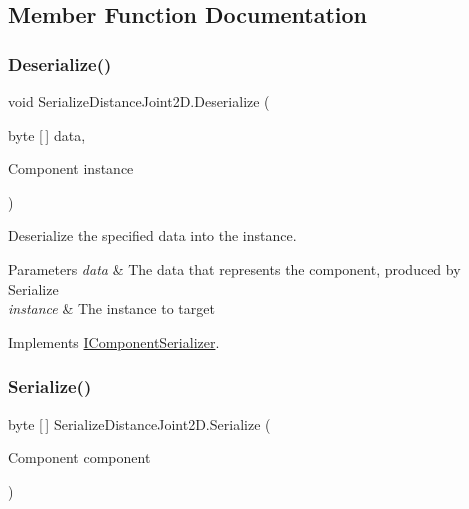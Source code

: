 \subsection{Member Function Documentation}
\mbox{\label{class_serialize_distance_joint2_d_a0b7341e25aba6354afa746c912bb20f5}} 
\subsubsection{\texorpdfstring{Deserialize()}{Deserialize()}}
{\footnotesize\ttfamily void Serialize\+Distance\+Joint2\+D.\+Deserialize (\begin{DoxyParamCaption}\item[{byte \mbox{[}$\,$\mbox{]}}]{data,  }\item[{Component}]{instance }\end{DoxyParamCaption})\hspace{0.3cm}{\ttfamily [inline]}}



Deserialize the specified data into the instance. 


\begin{DoxyParams}{Parameters}
{\em data} & The data that represents the component, produced by Serialize \\
\hline
{\em instance} & The instance to target \\
\hline
\end{DoxyParams}


Implements \hyperlink{interface_i_component_serializer_a4cc366a5c78b33d47a90c209d8fed883}{I\+Component\+Serializer}.

\mbox{\label{class_serialize_distance_joint2_d_a5eecfd9c48d46eb25958ffb301924b3b}} 
\subsubsection{\texorpdfstring{Serialize()}{Serialize()}}
{\footnotesize\ttfamily byte \mbox{[}$\,$\mbox{]} Serialize\+Distance\+Joint2\+D.\+Serialize (\begin{DoxyParamCaption}\item[{Component}]{component }\end{DoxyParamCaption})\hspace{0.3cm}{\ttfamily [inline]}}



